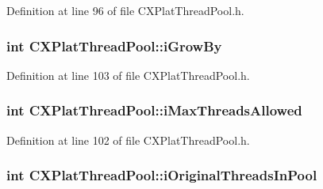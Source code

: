 \-Definition at line 96 of file \-C\-X\-Plat\-Thread\-Pool.\-h.

\hypertarget{class_c_x_plat_thread_pool_af241301a871a1468678540d48fcc9985}{
\subsubsection[{i\-Grow\-By}]{\setlength{\rightskip}{0pt plus 5cm}int {\bf \-C\-X\-Plat\-Thread\-Pool\-::i\-Grow\-By}}}\label{class_c_x_plat_thread_pool_af241301a871a1468678540d48fcc9985}


\-Definition at line 103 of file \-C\-X\-Plat\-Thread\-Pool.\-h.

\hypertarget{class_c_x_plat_thread_pool_aa68b8ad1860d7e86bb6030046876ac9e}{
\subsubsection[{i\-Max\-Threads\-Allowed}]{\setlength{\rightskip}{0pt plus 5cm}int {\bf \-C\-X\-Plat\-Thread\-Pool\-::i\-Max\-Threads\-Allowed}}}\label{class_c_x_plat_thread_pool_aa68b8ad1860d7e86bb6030046876ac9e}


\-Definition at line 102 of file \-C\-X\-Plat\-Thread\-Pool.\-h.

\hypertarget{class_c_x_plat_thread_pool_ad48b1855b53944a36387466ec4edf075}{
\subsubsection[{i\-Original\-Threads\-In\-Pool}]{\setlength{\rightskip}{0pt plus 5cm}int {\bf \-C\-X\-Plat\-Thread\-Pool\-::i\-Original\-Threads\-In\-Pool}}}\label{class_c_x_plat_thread_pool_ad48b1855b53944a36387466ec4edf075}


